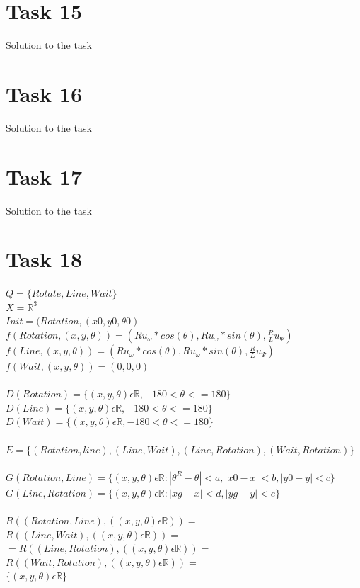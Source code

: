 \documentclass[a4paper,12pt,oneside,onecolumn]{article} %
\begin{document}
\section*{Task 15}

Solution to the task

\section*{Task 16}

Solution to the task

\section*{Task 17}

Solution to the task

\section*{Task 18}

	$Q = \{Rotate,Line,Wait\}$\\
	$X = \mathbb{R}^3$\\
	$Init = (Rotation,(x0,y0,\theta0)$
	\\
	$f(Rotation,(x,y,\theta)) = (Ru_\omega*cos(\theta),Ru_\omega*sin(\theta),\frac{R}{L}u_\Psi)$\\
	$f(Line,(x,y,\theta)) = (Ru_\omega*cos(\theta),Ru_\omega*sin(\theta),\frac{R}{L}u_\Psi)$\\
	$f(Wait,(x,y,\theta)) = (0,0,0)$\\
	\\
	$D(Rotation) = \{(x,y,\theta) \epsilon \mathbb{R}, -180 < \theta <= 180\}$\\
	$D(Line) = \{(x,y,\theta) \epsilon \mathbb{R}, -180 < \theta <= 180\}$\\
	$D(Wait) = \{(x,y,\theta) \epsilon \mathbb{R}, -180 < \theta <= 180\}$\\
	\\
	$E = \{ (Rotation,line),(Line,Wait),(Line,Rotation),(Wait,Rotation)\}$\\\\
	$G(Rotation, Line) = \{(x,y,\theta) \epsilon \mathbb{R}: |\theta^R - \theta| < a, |x0 - x| < b, |y0 -y| < c\}$\\
	$G(Line, Rotation)=\{(x,y,\theta) \epsilon \mathbb{R}: |xg - x|<d,|yg -y|<e\}$\\\\	
	$R((Rotation, Line), ((x,y,\theta) \epsilon \mathbb{R}))=$ 
	$R((Line, Wait), ((x,y,\theta) \epsilon \mathbb{R}))=$\\
	$=R((Line, Rotation), ((x,y,\theta) \epsilon \mathbb{R}))=$
	$R((Wait, Rotation), ((x,y,\theta) \epsilon \mathbb{R}))=$\\$\{(x,y,\theta) \epsilon \mathbb{R}\}$\\
\end{document}
